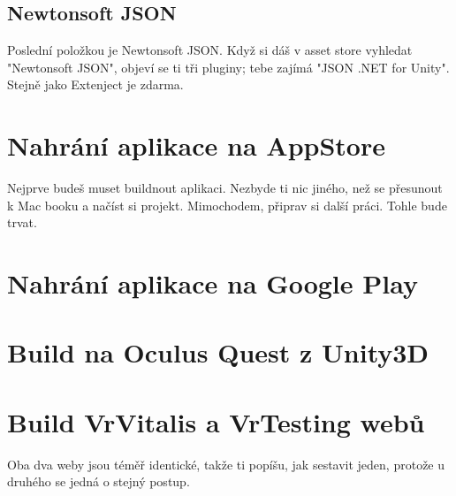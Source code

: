 \documentclass{article}
\begin{document}
\subsection{Newtonsoft JSON}
Poslední položkou je Newtonsoft JSON. Když si dáš v asset store vyhledat "Newtonsoft JSON", objeví se ti tři pluginy; tebe zajímá "JSON .NET for Unity". Stejně jako Extenject je zdarma.

\pagebreak

\section{Nahrání aplikace na AppStore}
Nejprve budeš muset buildnout aplikaci. Nezbyde ti nic jiného, než se přesunout k Mac booku a načíst si projekt. Mimochodem, připrav si další práci. Tohle bude trvat.
\pagebreak

\section{Nahrání aplikace na Google Play}
\pagebreak

\section{Build na Oculus Quest z Unity3D}
\pagebreak

\section{Build VrVitalis a VrTesting webů}
Oba dva weby jsou téměř identické, takže ti popíšu, jak sestavit jeden, protože u druhého se jedná o stejný postup.
\pagebreak
\end{document}

